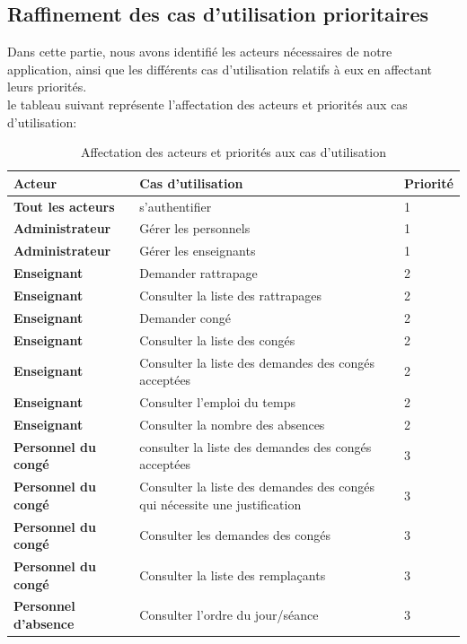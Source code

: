\documentclass[12 pt ]{report}
\begin{document}
\subsection{Raffinement des cas d'utilisation prioritaires}
Dans cette partie, nous avons identifié les acteurs nécessaires de notre application, ainsi que les différents cas d’utilisation relatifs à eux en affectant leurs priorités.
\\ 
le tableau suivant représente l'affectation des acteurs et priorités aux cas d'utilisation:
\begin{table}[htbp]
\begin{center}
\caption{Affectation des acteurs et priorités aux cas d’utilisation \label{table-nom}}
\renewcommand{\arraystretch}{1.7}
\begin{tabular}{|p{5 cm}|p{6 cm}|p{5 cm}|} 
 
\hline 
\cellcolor{PaleTurquoise}\textbf{Acteur} &\cellcolor{PaleTurquoise} \textbf{Cas d’utilisation} &\cellcolor{PaleTurquoise} \textbf{Priorité} \\
\hline
\textbf{Tout les acteurs} & s'authentifier&  1
 \\
\hline
\textbf{Administrateur}&Gérer les personnels& 1 \\
\hline
\textbf{Administrateur}&Gérer les enseignants
& 1 \\
\hline
\textbf{Enseignant}& Demander rattrapage
& 2 \\
\hline
\textbf{Enseignant}& Consulter la liste des rattrapages
& 2 \\
\hline
\textbf{Enseignant}& Demander congé
& 2 \\
\hline
\textbf{Enseignant}& Consulter la liste des congés 
& 2 \\
\hline
\textbf{Enseignant}& Consulter la liste des demandes des congés acceptées
& 2 \\
\hline
\textbf{Enseignant}& Consulter l'emploi du temps
& 2 \\
\hline
\textbf{Enseignant}& Consulter la nombre des absences
& 2 \\
\hline

\textbf{Personnel du congé}&   consulter la liste des demandes des congés acceptées & 3 \\
  \hline
\textbf{Personnel du congé}&   Consulter la liste des demandes des congés qui nécessite une justification & 3 \\
\hline
\textbf{Personnel du congé}& Consulter les demandes des congés & 3 \\
 \hline
\textbf{Personnel du congé}&   Consulter la liste des remplaçants & 3 \\
\hline
\textbf{Personnel d'absence}&Consulter l'ordre du jour/séance& 3\\
\hline

\end{tabular}
\end{center}
\end{table}
\newpage
\end{document}
